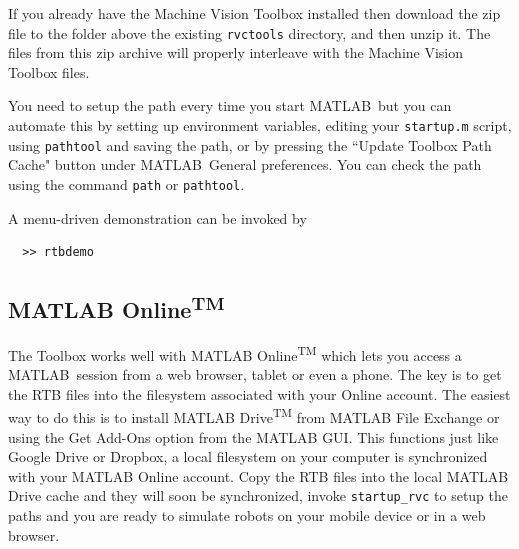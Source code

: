 \documentclass[a4paper,twoside]{report}
\def\Mlab{MATLAB}
\begin{document}
If you already have the Machine Vision Toolbox installed then download
the zip file to the folder above the existing \texttt{rvctools} directory,
and then unzip it.
The files from this zip archive will properly interleave with the Machine
Vision Toolbox files.

You need to setup the path every time you start \Mlab\ but you can 
automate this by setting up environment variables, editing your 
\texttt{startup.m} script, using \texttt{pathtool} and saving the path, or by pressing the ``Update Toolbox Path
Cache" button under \Mlab\ General preferences.
You can check the path using the command \texttt{path} or \texttt{pathtool}.

A menu-driven demonstration can be invoked by 
\begin{verbatim}
  >> rtbdemo
\end{verbatim}


\subsection{MATLAB Online\textsuperscript{TM}}
The Toolbox works well with MATLAB Online\textsuperscript{TM} which lets you access a \Mlab\ session from a web browser, tablet 
or even a phone.
The key is to get the RTB files into the filesystem associated with your Online account.  The easiest way to do this is to install
MATLAB Drive\textsuperscript{TM} from MATLAB File Exchange or using the Get Add-Ons option from the MATLAB GUI.  This functions
just like Google Drive or Dropbox, a local filesystem on your computer is synchronized with your MATLAB Online account.  Copy the RTB
files into the local MATLAB Drive cache and they will soon be synchronized, invoke \texttt{startup\_rvc} to setup the paths and you are ready to simulate robots on your mobile device or in a web browser.
\end{document}

